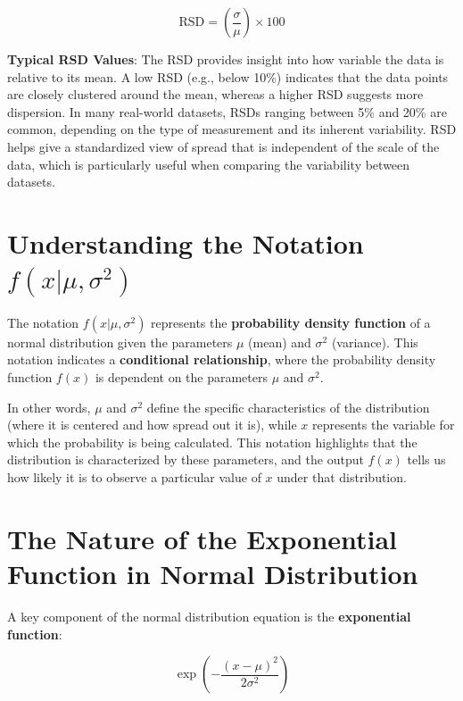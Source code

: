 \documentclass[
  12 pt,
  a4paper,
]{book}
\numberwithin{equation}{section}
\theoremstyle{plain}      %
\theoremstyle{definition} %
\theoremstyle{remark}     %
\theoremstyle{note}         %
\begin{document}
\[
\text{RSD} = \left( \frac{\sigma}{\mu} \right) \times 100
\]

\textbf{Typical RSD Values}: The RSD provides insight into how variable
the data is relative to its mean. A low RSD (e.g., below 10\%) indicates
that the data points are closely clustered around the mean, whereas a
higher RSD suggests more dispersion. In many real-world datasets, RSDs
ranging between 5\% and 20\% are common, depending on the type of
measurement and its inherent variability. RSD helps give a standardized
view of spread that is independent of the scale of the data, which is
particularly useful when comparing the variability between datasets.

\hypertarget{understanding-the-notation-fx-mu-sigma2}{%
\section{\texorpdfstring{Understanding the Notation
\(f(x | \mu, \sigma^2)\)}{Understanding the Notation f(x \textbar{} \textbackslash mu, \textbackslash sigma\^{}2)}}\label{understanding-the-notation-fx-mu-sigma2}}

The notation \(f(x | \mu, \sigma^2)\) represents the \textbf{probability
density function} of a normal distribution given the parameters \(\mu\)
(mean) and \(\sigma^2\) (variance). This notation indicates a
\textbf{conditional relationship}, where the probability density
function \(f(x)\) is dependent on the parameters \(\mu\) and
\(\sigma^2\).

In other words, \(\mu\) and \(\sigma^2\) define the specific
characteristics of the distribution (where it is centered and how spread
out it is), while \(x\) represents the variable for which the
probability is being calculated. This notation highlights that the
distribution is characterized by these parameters, and the output
\(f(x)\) tells us how likely it is to observe a particular value of
\(x\) under that distribution.

\hypertarget{the-nature-of-the-exponential-function-in-normal-distribution}{%
\section{The Nature of the Exponential Function in Normal
Distribution}\label{the-nature-of-the-exponential-function-in-normal-distribution}}

A key component of the normal distribution equation is the
\textbf{exponential function}:

\[
\exp\left( - \frac{(x - \mu)^2}{2\sigma^2} \right)
\]
\end{document}
